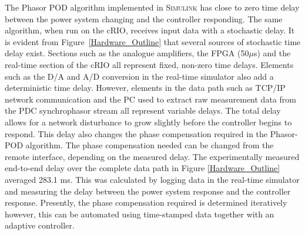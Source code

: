 \documentclass[journal]{IEEEtran}
\begin{document}
The Phasor POD algorithm implemented in \textsc{Simulink} has close to zero time delay between the power system changing and the controller responding. The same algorithm, when run on the cRIO, receives input data with a stochastic delay. It is evident from Figure~\ref{Hardware_Outline} that several sources of stochastic time delay exist. Sections such as the analogue amplifiers, the FPGA (50$\mu$s) and the real-time section of the cRIO all represent fixed, non-zero time delays. Elements such as the D/A and A/D conversion in the real-time simulator also add a deterministic time delay. However, elements in the data path such as TCP/IP network communication and the PC used to extract raw measurement data from the PDC synchrophasor stream all represent variable delays. The total delay allows for a network disturbance to grow slightly before the controller begins to respond. This delay also changes the phase compensation required in the Phasor-POD algorithm. The phase compensation needed can be changed from the remote interface, depending on the measured delay. The experimentally measured end-to-end delay over the complete data path in Figure \ref{Hardware_Outline} averaged 283.1 ms. This was calculated by logging data in the real-time simulator and measuring the delay between the power system response and the controller response. Presently, the phase compensation required is determined iteratively however, this can be automated using time-stamped data together with an adaptive controller.

\end{document}
